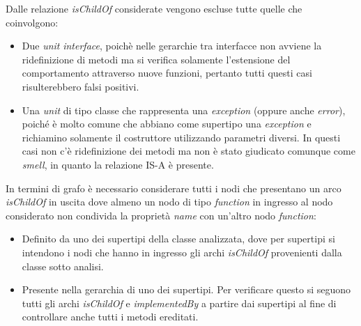         Dalle relazione \textit{isChildOf} considerate vengono escluse tutte quelle che coinvolgono:
        \begin{itemize}
            \item Due \textit{unit} \textit{interface}, poichè nelle gerarchie tra interfacce non avviene la ridefinizione di metodi ma si verifica solamente l'estensione del comportamento attraverso nuove funzioni, pertanto tutti questi casi risulterebbero falsi positivi.
            
            \item Una \textit{unit} di tipo classe che rappresenta una \textit{exception} (oppure anche \textit{error}), poiché è molto comune che abbiano come supertipo una \textit{exception} e richiamino solamente il costruttore utilizzando parametri diversi. In questi casi non c'è ridefinizione dei metodi ma non è stato giudicato comunque come \textit{smell}, in quanto la relazione IS-A è presente.
        \end{itemize}
        In termini di grafo è necessario considerare tutti i nodi che presentano un arco \textit{isChildOf} in uscita dove almeno un nodo di tipo \textit{function} in ingresso al nodo considerato non condivida la proprietà \textit{name} con un'altro nodo \textit{function}:
        \begin{itemize}
            \item Definito da uno dei supertipi della classe analizzata, dove per supertipi si intendono i nodi che hanno in ingresso gli archi \textit{isChildOf} provenienti dalla classe sotto analisi.
            
            \item Presente nella gerarchia di uno dei supertipi. Per verificare questo si seguono tutti gli archi \textit{isChildOf} e \textit{implementedBy} a partire dai supertipi al fine di controllare anche tutti i metodi ereditati.
        \end{itemize}
        
